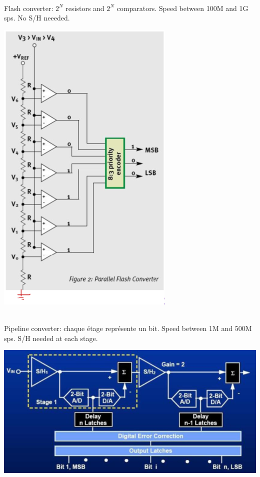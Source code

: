 \documentclass[resume]{subfiles}
\begin{document}
\begin{multicols}{3}
\begin{minipage}{\linewidth}
\end{minipage}\\
Flash converter: $2^N$ resistors and $2^N$ comparators. Speed between 100M and 1G sps. No S/H neeeded.\\
\begin{minipage}{\linewidth}
	\centering
    \includegraphics[width =0.7\columnwidth]{an10.png}
\end{minipage}\\
Pipeline converter: chaque étage représente un bit. Speed between 1M and 500M sps. S/H needed at each stage.\\
\begin{minipage}{\linewidth}
	\centering
    \includegraphics[width =0.7\columnwidth]{an11.png}

\end{minipage}
\end{multicols}
\end{document}
